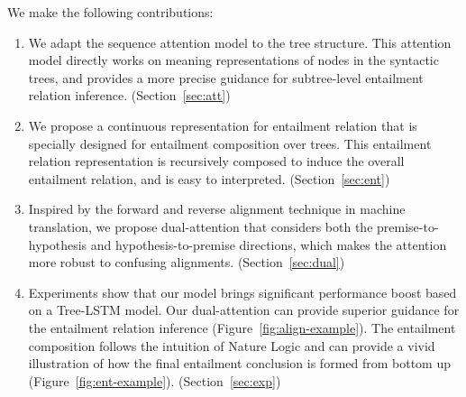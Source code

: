 We make the following contributions:
\begin{enumerate}
\item We adapt the sequence attention model to the tree structure.
This attention model directly works on meaning representations
of nodes in the syntactic trees,
and provides a more precise guidance for 
subtree-level entailment relation inference. (Section~\ref{sec:att})
\item We propose a continuous representation for entailment
relation that is specially designed for entailment composition
over trees. This entailment relation representation
is recursively composed to induce the overall
entailment relation, and is easy to interpreted.
(Section~\ref{sec:ent})
\item Inspired by the forward and reverse
alignment technique in machine translation,
we propose dual-attention that 
considers both the premise-to-hypothesis
and hypothesis-to-premise directions, which makes the
attention more robust to confusing alignments. (Section~\ref{sec:dual})
\item Experiments show that our model brings significant 
performance boost based on a Tree-LSTM model.
Our dual-attention can provide superior guidance for the entailment relation inference
(Figure~\ref{fig:align-example}).
The entailment composition follows the intuition of Nature Logic
and can provide a vivid illustration of how the final entailment
 conclusion
is formed from bottom up (Figure~\ref{fig:ent-example}).
(Section~\ref{sec:exp})  
\end{enumerate}

